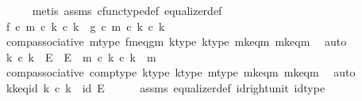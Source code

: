 \begin{isabellebody}
\ \ \ \ \isamarkupfalse%
\ {\isacharparenleft}{\kern0pt}metis\ assms\ cfunc{\isacharunderscore}{\kern0pt}type{\isacharunderscore}{\kern0pt}def\ equalizer{\isacharunderscore}{\kern0pt}def{\isacharparenright}{\kern0pt}\isanewline
\isanewline
\ \ \isamarkupfalse%
\ {\isachardoublequoteopen}f\ {\isasymcirc}\isactrlsub c\ m\ {\isasymcirc}\isactrlsub c\ k\ {\isasymcirc}\isactrlsub c\ k{\isacharprime}{\kern0pt}\ {\isacharequal}{\kern0pt}\ g\ {\isasymcirc}\isactrlsub c\ m\ {\isasymcirc}\isactrlsub c\ k\ {\isasymcirc}\isactrlsub c\ k{\isacharprime}{\kern0pt}{\isachardoublequoteclose}\isanewline
\ \ \ \ \isamarkupfalse%
\ comp{\isacharunderscore}{\kern0pt}associative{}\ m{\isacharunderscore}{\kern0pt}type\ fm{\isacharunderscore}{\kern0pt}eq{\isacharunderscore}{\kern0pt}gm\ k{\isacharprime}{\kern0pt}{\isacharunderscore}{\kern0pt}type\ k{\isacharunderscore}{\kern0pt}type\ m{\isacharprime}{\kern0pt}k{\isacharunderscore}{\kern0pt}eq{\isacharunderscore}{\kern0pt}m\ mk{\isacharunderscore}{\kern0pt}eq{\isacharunderscore}{\kern0pt}m{\isacharprime}{\kern0pt}\ \isamarkupfalse%
\ auto\isanewline
\isanewline
\ \ \isamarkupfalse%
\ {\isachardoublequoteopen}k\ {\isasymcirc}\isactrlsub c\ k{\isacharprime}{\kern0pt}\ {\isacharcolon}{\kern0pt}\ E\ {\isasymrightarrow}\ E\ {\isasymand}\ m\ {\isasymcirc}\isactrlsub c\ k\ {\isasymcirc}\isactrlsub c\ k{\isacharprime}{\kern0pt}\ {\isacharequal}{\kern0pt}\ m{\isachardoublequoteclose}\isanewline
\ \ \ \ \isamarkupfalse%
\ comp{\isacharunderscore}{\kern0pt}associative{}\ comp{\isacharunderscore}{\kern0pt}type\ k{\isacharprime}{\kern0pt}{\isacharunderscore}{\kern0pt}type\ k{\isacharunderscore}{\kern0pt}type\ m{\isacharunderscore}{\kern0pt}type\ m{\isacharprime}{\kern0pt}k{\isacharunderscore}{\kern0pt}eq{\isacharunderscore}{\kern0pt}m\ mk{\isacharunderscore}{\kern0pt}eq{\isacharunderscore}{\kern0pt}m{\isacharprime}{\kern0pt}\ \isamarkupfalse%
\ auto\isanewline
\ \ \isamarkupfalse%
\ \isamarkupfalse%
\ kk{\isacharprime}{\kern0pt}{\isacharunderscore}{\kern0pt}eq{\isacharunderscore}{\kern0pt}id{\isacharcolon}{\kern0pt}\ {\isachardoublequoteopen}k\ {\isasymcirc}\isactrlsub c\ k{\isacharprime}{\kern0pt}\ {\isacharequal}{\kern0pt}\ id\ E{\isachardoublequoteclose}\isanewline
\ \ \ \ \isamarkupfalse%
\ assms{\isacharparenleft}{\kern0pt}{}{\isacharparenright}{\kern0pt}\ equalizer{\isacharunderscore}{\kern0pt}def\ id{\isacharunderscore}{\kern0pt}right{\isacharunderscore}{\kern0pt}unit{}\ id{\isacharunderscore}{\kern0pt}type\ \isamarkupfalse%

\end{isabellebody}
